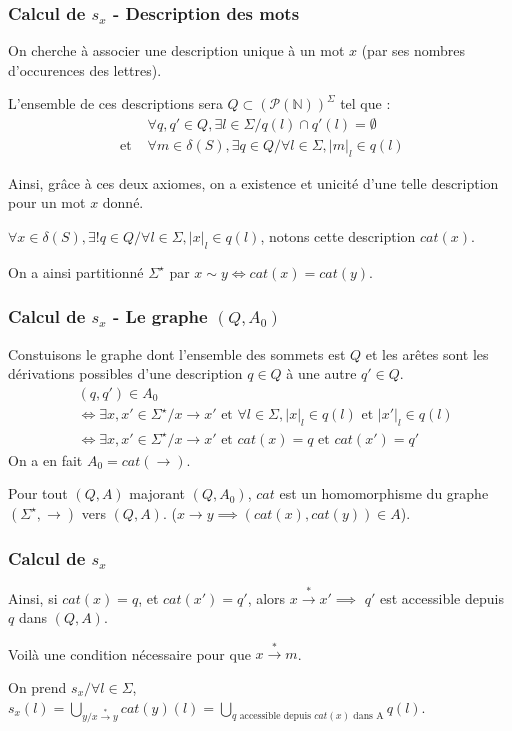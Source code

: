 \documentclass[12pt]{beamer}
\newcommand{\norm}[1]{\lvert #1 \rvert}
\begin{document}
\begin{frame}\frametitle{Calcul de $s_x$ - Description des mots}
On cherche à associer une description unique à un mot $x$ (par ses nombres d'occurences des lettres).

L'ensemble de ces descriptions sera
$Q \subset ({\mathcal{P}(\mathbb{N})})^{\Sigma}$ tel que :
\begin{align*}
    &\forall q,q' \in Q, \exists l \in \Sigma / q(l) \cap q'(l) = \emptyset\\
    \text{ et }&\forall m \in \delta(S), \exists q \in Q / \forall l \in \Sigma, \norm{m}_l \in q(l)
\end{align*}

Ainsi, grâce à ces deux axiomes, on a existence et unicité d'une telle description pour un mot $x$ donné.

$\forall x \in \delta(S), \exists ! q \in Q / \forall l \in \Sigma, \norm{x}_l \in q(l)$, notons cette description $cat(x)$.

On a ainsi partitionné $\Sigma^\star$ par $x \sim y \iff cat(x) = cat(y)$.
\end{frame}

\begin{frame}\frametitle{Calcul de $s_x$ - Le graphe $(Q,A_0)$}
Constuisons le graphe dont l'ensemble des sommets est $Q$ et les arêtes sont les dérivations possibles d'une description $q \in Q$ à une autre $q' \in Q$.
\begin{align*}
    &(q,q') \in A_0 \\
    &\iff \exists x,x' \in \Sigma^\star / x \rightarrow x' \text{ et } \forall l \in \Sigma, \norm{x}_l \in q(l) \text{ et } \norm{x'}_l \in q(l)\\
    &\iff \exists x,x' \in \Sigma^\star / x \rightarrow x' \text{ et } cat(x) = q \text{ et } cat(x') = q'
\end{align*}
On a en fait $A_0 = cat(\rightarrow)$.

Pour tout $(Q,A)$ majorant $(Q,A_0)$, $cat$ est un homomorphisme du graphe $(\Sigma^\star,\rightarrow)$ vers $(Q,A)$. ($x \rightarrow y \implies (cat(x),cat(y)) \in A$).

\end{frame}
\begin{frame}\frametitle{Calcul de $s_x$}
Ainsi, si $cat(x) = q$, et $cat(x')=q'$, alors $x \overset{*}{\rightarrow} x' \implies$ $q'$ est accessible depuis $q$ dans $(Q,A)$.

Voilà une condition nécessaire pour que $x \overset{*}{\rightarrow} m$.

On prend $s_x / \forall l \in \Sigma$, $s_x(l) = \bigcup_{y / x\overset{*}{\rightarrow} y} cat(y)(l) = \bigcup_{q\text{ accessible depuis } cat(x) \text{ dans A}}q(l)$.

\end{frame}
\end{document}
